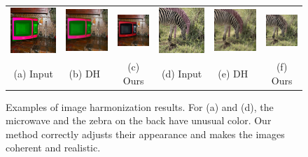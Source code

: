 \begin{figure}[!ht]
\centering
\small
\setlength\tabcolsep{1pt}
\begin{tabular}{cccccc}
  \includegraphics[width=.17\textwidth]{figures/hm/000000319696_input_image.jpg}&
  \includegraphics[width=.17\textwidth]{figures/hm/000000319696_synthesized_image.jpg}&
  \includegraphics[width=.17\textwidth]{figures/hm/000000319696_synthesized_image-1.jpg}&
  \includegraphics[width=.17\textwidth]{figures/hm/000000159311_input_image.jpg}&
  \includegraphics[width=.17\textwidth]{figures/hm/000000159311_synthesized_image.jpg}&
  \includegraphics[width=.17\textwidth]{figures/hm/000000159311_synthesized_image-1.jpg} \\
  (a) Input & (b) DH~\cite{tsai2017deep}  & (c) Ours & (d) Input & (e) DH~\cite{tsai2017deep}  & (f) Ours \\
\end{tabular}
\caption{Examples of image harmonization results. For (a) and (d), the microwave and the zebra on the back have unusual color. Our method correctly adjusts their appearance and makes the images coherent and realistic. }
\label{fig:harm}
\end{figure}

